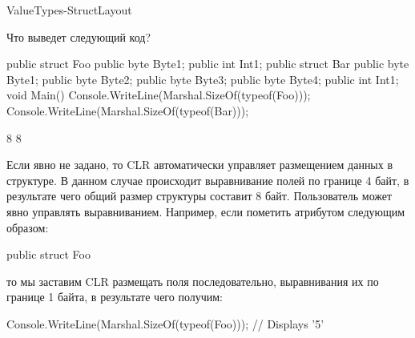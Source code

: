 \begin{defproblem}{ValueTypes-StructLayout}
\begin{onlyproblem}
  Что выведет следующий код?
  \begin{source}
  public struct Foo
  {
    public byte Byte1;
    public int Int1;
  }
  public struct Bar
  {
    public byte Byte1;
    public byte Byte2;
    public byte Byte3;
    public byte Byte4;
    public int Int1;
  }
  void Main()
  {
    Console.WriteLine(Marshal.SizeOf(typeof(Foo)));
    Console.WriteLine(Marshal.SizeOf(typeof(Bar)));
  }
  \end{source}
\end{onlyproblem}
\begin{onlysolution}
  \begin{source}
  8
  8
  \end{source}
  Если явно не задано, то CLR автоматически управляет размещением данных в структуре. В данном случае происходит выравнивание полей по границе 4 байт, в результате чего общий размер структуры составит 8 байт. Пользователь может явно управлять выравниванием. Например, если пометить  атрибутом  следующим образом:
  \begin{source}
  [StructLayout(LayoutKind.Sequential, Pack=1)]
  public struct Foo
  \end{source}
  то мы заставим CLR размещать поля последовательно, выравнивания их по границе 1 байта, в результате чего получим:
  \begin{source}
  Console.WriteLine(Marshal.SizeOf(typeof(Foo))); // Displays '5'
  \end{source}
\end{onlysolution}
\end{defproblem}
